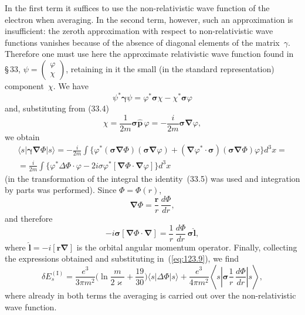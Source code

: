 
In the first term it suffices to use the non-relativistic wave function of the electron when averaging. In the second term, however, such an approximation is insufficient: the zeroth approximation with respect to non-relativistic wave functions vanishes because of the absence of diagonal elements of the matrix~$\gamma$. Therefore one must use here the approximate relativistic wave function found in \S\,33, $\psi = \begin{pmatrix}\varphi \\ \chi\end{pmatrix}$, retaining in it the small (in the standard representation) component~$\chi$. We have
\[
\psi^*\boldsymbol{\gamma}\psi = \varphi^*\boldsymbol{\sigma}\chi - \chi^*\boldsymbol{\sigma}\varphi
\]
and, substituting from (33.4)
\[
\chi = \frac{1}{2m}\boldsymbol{\sigma}\hat{\mathbf{p}}\,\varphi = -\frac{i}{2m}\boldsymbol{\sigma}\boldsymbol{\nabla}\varphi,
\]
we obtain
\begin{multline*}
\langle s|\boldsymbol{\gamma}\boldsymbol{\nabla}\Phi|s\rangle = -\frac{i}{2m}\int\bigl\{\varphi^*(\boldsymbol{\sigma}\boldsymbol{\nabla}\Phi)(\boldsymbol{\sigma}\boldsymbol{\nabla}\varphi) + (\boldsymbol{\nabla}\varphi^*\!\cdot\boldsymbol{\sigma})(\boldsymbol{\sigma}\boldsymbol{\nabla}\Phi)\varphi\bigr\}d^3x = {} \\
= \frac{i}{2m}\int\bigl\{\varphi^*\Delta\Phi\cdot\varphi - 2i\sigma\varphi^*[\boldsymbol{\nabla}\Phi\cdot\boldsymbol{\nabla}\varphi]\bigr\}d^3x
\end{multline*}
(in the transformation of the integral the identity~(33.5) was used and integration by parts was performed). Since $\Phi = \Phi(r)$,
\[
\boldsymbol{\nabla}\Phi = \frac{\mathbf{r}}{r}\,\frac{d\Phi}{dr},
\]
and therefore
\[
-i\boldsymbol{\sigma}[\boldsymbol{\nabla}\Phi\cdot\boldsymbol{\nabla}] = \frac{1}{r}\,\frac{d\Phi}{dr}\,\boldsymbol{\sigma}\hat{\mathbf{l}},
\]
where $\hat{\mathbf{l}} = -i[\mathbf{r}\boldsymbol{\nabla}]$ is the orbital angular momentum operator. Finally, collecting the expressions obtained and substituting in~(\ref{eq:123.9}), we find
\begin{equation}
\delta E_s^{(\mathrm{I})} = \frac{e^3}{3\pi m^2}\biggl(\ln\frac{m}{2\varkappa} + \frac{19}{30}\biggr)\langle s|\Delta\Phi|s\rangle + \frac{e^3}{4\pi m^2}\left\langle s\left|\boldsymbol{\sigma}\frac{1}{r}\,\frac{d\Phi}{dr}\right|s\right\rangle,
\label{eq:123.10}
\end{equation}
where already in both terms the averaging is carried out over the non-relativistic wave function.

